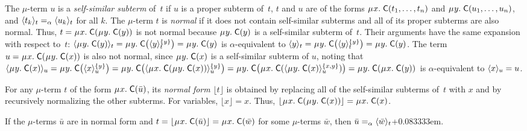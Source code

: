 \documentclass[smallcondensed,draft]{svjour3}
\newcommand\MU{\vvthinspace\mu\vvthinspace}
\newcommand\const[1]{\textsf{#1}}
\renewcommand{\vec}[1]{\bar #1}
\newcommand{\expand}[2]{\langle \smash{#2} \rangle_{#1}}
\newcommand{\nf}[1]{\lfloor#1\rfloor}
\newcommand{\aequiv}{\mathrel{=_\alpha}}
\newcommand{\vsim}{\aequiv}
\newcommand\vvthinspace{\kern+0.041667em}
\newcommand\vthinspace{\kern+0.083333em}
\begin{document}
The $\mu$-term $u$
is a \emph{self-similar subterm} of~$t$ if
$u$ is a proper subterm of~$t$,
$t$ and $u$ are of the forms $\MU x.\; \const{C}( t_1, \ldots, t_n )$
and $\MU y.\; \const{C}( u_1, \ldots, u_n )$,
and $\expand{t}{ t_k } \aequiv \expand{t}{ u_k }$ for all $k$. %
The $\mu$-term $t$ is \emph{normal} if it does not contain %
self-similar subterms
and all of its proper subterms are also normal.
Thus, $t = \MU x.\; \const{C}( \MU y.\; \const{C}( y ) )$ is not normal
because $\MU y.\; \const{C}( y )$ is a self-similar subterm of~$t$.
Their arguments have the same expansion with respect to~$t$:
$\expand{t}{\MU y.\; \const{C}( y )} =
\MU y.\; \const{C}\bigl( \expand{t}{y}^{\smash{\{y\}}} \bigr) =
\MU y.\; \const{C}( y )$
is $\alpha$-equivalent to
$\expand{t}{y} =
\MU y.\; \const{C}\bigl( \expand{t}{y}^{\smash{\{y\}}} \bigr) =
\MU y.\; \const{C}( y )$.
The term $u = \MU x.\; \const{C}( \MU y.\; \const{C}( x ) )$ is also not normal,
since $\MU y.\; \const{C}( x )$ is a self-similar subterm of $u$,
noting that
%
$\expand{u}{\MU y.\; \const{C}( x )}
 = \MU y.\; \const{C}\bigl( \expand{u}{x}^{\smash{\{y\}}} \bigr)
 = \MU y.\; \const{C}\bigl( \expand{u}{\MU x.\allowbreak\; \const{C}( \MU y.\allowbreak\; \const{C}( x ) ) }^{\smash{\{y\}}} \bigr)
 = \MU y.\; \const{C}\bigl( \MU x.\allowbreak\; \const{C}( \expand{u}{\MU y.\allowbreak\; \const{C}( x )}^{\smash{\{x,y\}}} ) \bigr)
 = \MU y.\allowbreak\; \const{C}( \MU x.\allowbreak\; \const{C}( y ) )$
is $\alpha$-equivalent to $\expand{u}{x} = u$.

For any $\mu$-term $t$ of the form $\MU x.\; \const C( \vec u )$,
its \emph{normal form} $\nf{t}$ is obtained
by replacing all of the self-similar subterms of~$t$ with $x$
and by recursively normalizing the other subterms.
For variables, $\nf{x} = x$.
Thus, $\nf{\MU x.\; \const{C}( \MU y.\; \const{C}( x ) )} = \MU x.\; \const{C}( x )$.

\begin{lemma}
\label{lem:mu-norm-arg}
If the $\mu$-terms $\vec u$ are in normal form and $t = \nf{\MU x.\; \const{C}( \vec u )} = \MU x.\; \const{C}( \vec w )$
for some $\mu$-terms $\vec w$,
then $\vec u \vsim \expand{t}{\vec w}$\vthinspace.
\end{lemma}

\end{document}
